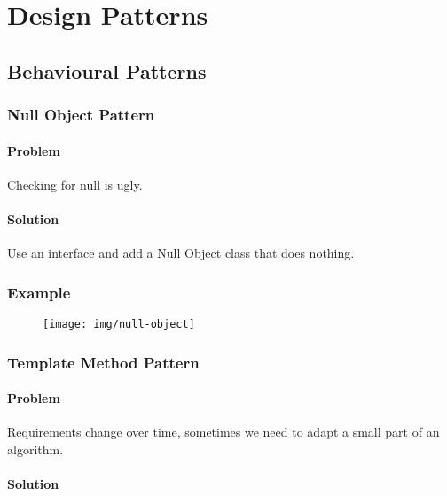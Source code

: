 \documentclass[twocolumn,english]{article}
\begin{document}
\section{Design Patterns}


\subsection{Behavioural Patterns}


\subsubsection{Null Object Pattern}


\paragraph{Problem}

Checking for null is ugly.


\paragraph{Solution}

Use an interface and add a Null Object class that does nothing.


\subsubsection*{Example}

\begin{figure}[H]
\centering{}\texttt{[image: img/null-object]} 
\end{figure}



\subsubsection{Template Method Pattern}


\paragraph{Problem}

Requirements change over time, sometimes we need to adapt a small
part of an algorithm.


\paragraph{Solution}
\end{document}

